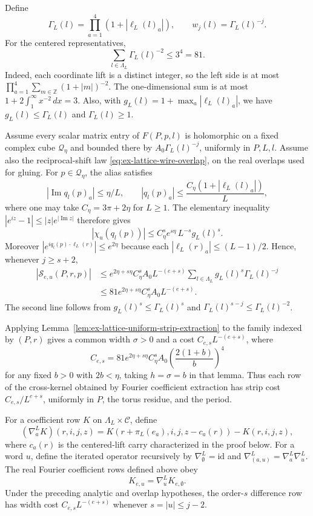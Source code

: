 Define
\[
 \Gamma_L(l)=\prod_{a=1}^4(1+|\ell_L(l)_a|),\qquad
 w_j(l)=\Gamma_L(l)^{-j}.
\]
For the centered representatives,
\begin{equation}
 \sum_{l\in\Lambda_L}\Gamma_L(l)^{-2}\leq 3^4=81.
 \label{eq:ex-lattice-residue-sum}
\end{equation}
Indeed, each coordinate lift is a distinct integer, so the left side is at
most $\prod_{a=1}^4\sum_{m\in\mathbb Z}(1+|m|)^{-2}$. The one-dimensional
sum is at most $1+2\int_1^\infty x^{-2}\,dx=3$.
Also, with $g_L(l)=1+\max_a|\ell_L(l)_a|$, we have
$g_L(l)\leq\Gamma_L(l)$ and $\Gamma_L(l)\geq1$.

Assume every scalar matrix entry of $F(P,p,l)$ is holomorphic on a fixed
complex cube $\mathcal Q_\eta$ and bounded there by
$A_0\Gamma_L(l)^{-j}$, uniformly in $P,L,l$. Assume also the reciprocal-shift law
\eqref{eq:ex-lattice-wire-overlap}, on the real overlaps used for gluing.
For $p\in\mathcal Q_\eta$, the alias satisfies
\[
 |\operatorname{Im}q_l(p)_a|\leq\eta/L,\qquad
 |q_l(p)_a|\leq \frac{C_\eta(1+|\ell_L(l)_a|)}{L},
\]
where one may take $C_\eta=3\pi+2\eta$ for $L\geq1$.
The elementary inequality
$|e^{iz}-1|\leq |z|e^{|\operatorname{Im}z|}$ therefore gives
\[
 |\chi_u(q_l(p))|
 \leq C_\eta^s e^{s\eta}\,L^{-s}g_L(l)^s.
\]
Moreover $|e^{iq_l(p)\cdot\ell_L(r)}|\leq e^{2\eta}$ because each
$|\ell_L(r)_a|\leq (L-1)/2$. Hence, whenever $j\geq s+2$,
\begin{equation}
\begin{split}
 |\mathcal S_{e,u}(P,r,p)|
 &\leq e^{2\eta+s\eta}C_\eta^s A_0L^{-(e+s)}
       \sum_{l\in\Lambda_L} g_L(l)^s\Gamma_L(l)^{-j}\\
 &\leq 81e^{2\eta+s\eta}C_\eta^s A_0L^{-(e+s)}.
 \label{eq:ex-lattice-spread-supremum}
\end{split}
\end{equation}
The second line follows from $g_L(l)^s\leq\Gamma_L(l)^s$ and
$\Gamma_L(l)^{s-j}\leq\Gamma_L(l)^{-2}$.

Applying Lemma~\ref{lem:ex-lattice-uniform-strip-extraction} to the family
indexed by $(P,r)$ gives a common width $\sigma>0$ and a cost
$C_{e,s}L^{-(e+s)}$, where
\[
 C_{e,s}=81e^{2\eta+s\eta}C_\eta^sA_0
          \left(\frac{2(1+b)}b\right)^4
\]
for any fixed $b>0$ with $2b<\eta$, taking $h=\sigma=b$ in that lemma. Thus each row of the cross-kernel
obtained by Fourier coefficient extraction has strip cost
$C_{e,s}/L^{e+s}$, uniformly in $P$, the torus residue, and the period.

\begin{lemma}
\label{lem:ex-lattice-residue-difference}
For a coefficient row $K$ on $\Lambda_L\times\mathcal C$, define
\[
 (\nabla_a^LK)(r,i,j,z)
 =K(r+\pi_L(e_a),i,j,z-c_a(r))-K(r,i,j,z),
\]
where $c_a(r)$ is the centered-lift carry characterized in the proof below.
For a word $u$, define the iterated operator recursively by
$\nabla_{\emptyset}^L=\mathrm{id}$ and
$\nabla_{(a,u)}^L=\nabla_a^L\nabla_u^L$. The real Fourier coefficient
rows defined above obey
\[
 K_{e,u}=\nabla_u^L K_{e,\emptyset}.
\]
Under the preceding analytic and overlap hypotheses, the order-$s$
difference row has width cost $C_{e,s}L^{-(e+s)}$ whenever
$s=|u|\leq j-2$.
\end{lemma}

